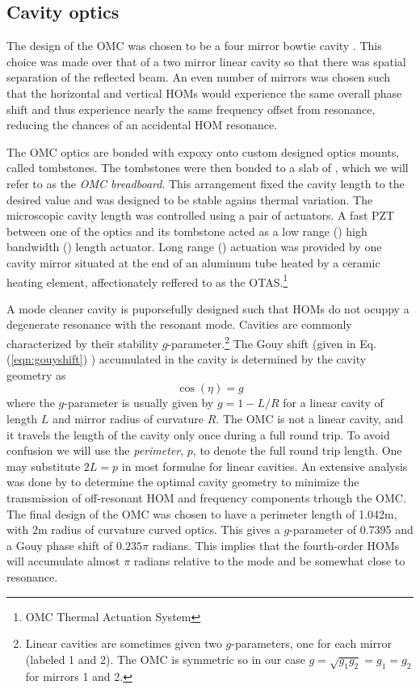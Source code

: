 \subsection{Cavity optics}
The design of the OMC was chosen to be a four mirror bowtie cavity . %
This choice was made over that of a two mirror linear cavity so that there was spatial separation of the reflected beam. %
An even number of mirrors was chosen such that the horizontal and vertical HOMs would experience the same overall phase shift and thus experience nearly the same frequency offset from resonance, reducing the chances of an accidental HOM resonance.

The OMC optics are bonded with  expoxy onto custom designed  optics mounts, called tombstones. %
The tombstones were then bonded to a slab of , which we will refer to as the \emph{OMC breadboard}. %
This arrangement fixed the cavity length to the desired value and was designed to be stable agains thermal variation. %
The microscopic cavity length was controlled using a pair of actuators. %
A fast PZT between one of the optics and its tombstone acted as a low range () high bandwidth () length actuator. %
Long range () actuation was provided by one cavity mirror situated at the end of an aluminum tube heated by a ceramic heating element, affectionately reffered to as the OTAS.\footnote{OMC Thermal Actuation System}

A mode cleaner cavity is puporsefully designed such that HOMs do not ocuppy a degenerate resonance with the resonant  mode. %
Cavities are commonly characterized by their stability $g$-parameter.\footnote{Linear cavities are sometimes given two $g$-parameters, one for each mirror (labeled 1 and 2). %
The OMC is symmetric so in our case $g=\sqrt{g_1g_2}=g_1=g_2$ for mirrors 1 and 2.} The Gouy shift (given in Eq. %
(\ref{eqn:gouyshift}) ) accumulated in the cavity is determined by the cavity geometry as 
\begin{equation}
\label{eqn:gouyg}
\cos(\eta)=g
\end{equation}
where the $g$-parameter is usually given by $g=1-L/R$ for a linear cavity of length $L$ and mirror radius of curvature $R$. %
The OMC is not a linear cavity, and it travels the length of the cavity only once during a full round trip. %
To avoid confusion we will use the \emph{perimeter}, $p$, to denote the full round trip length. %
One may substitute $2L=p$ in most formulae for linear cavities. %
An extensive analysis was done by  to determine the optimal cavity geometry to minimize the transmission of off-resonant HOM and frequency components trhough the OMC. The final design of the OMC was chosen to have a perimeter length of 1.042m, with 2m radius of curvature curved optics. %
This gives a $g$-parameter of 0.7395 and a Gouy phase shift of $0.235\pi$ radians. %
This implies that the fourth-order HOMs will accumulate almost $\pi$ radians relative to the  mode and be somewhat close to resonance.

